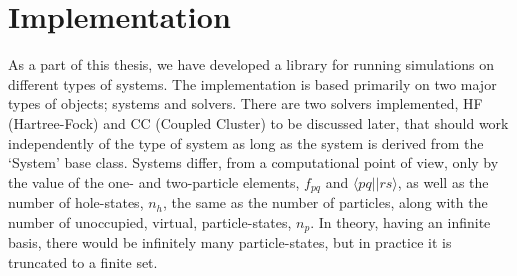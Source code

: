 \section{Implementation}
As a part of this thesis, we have developed a library for running simulations on different types of systems.
The implementation is based primarily on two major types of objects; systems and solvers.
There are two solvers implemented, HF (Hartree-Fock) and CC (Coupled Cluster) to be discussed later, that should work independently of the type of system as long as the system is derived from the `System' base class.
Systems differ, from a computational point of view, only by the value of the one- and two-particle elements, $f_{pq}$ and $\langle pq||rs \rangle$, as well as the number of hole-states, $n_h$, the same as the number of particles, along with the number of unoccupied, virtual, particle-states, $n_p$.
In theory, having an infinite basis, there would be infinitely many particle-states, but in practice it is truncated to a finite set.

